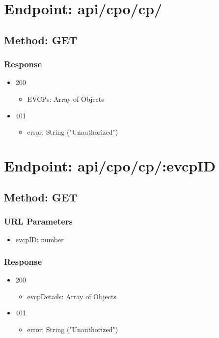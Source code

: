 \section*{Endpoint: api/cpo/cp/}
\subsection*{Method: GET}
\subsubsection*{Response}
\begin{itemize}
    \item 200
          \begin{itemize}
              \item EVCPs: Array of Objects
          \end{itemize}
    \item 401
          \begin{itemize}
              \item error: String ("Unauthorized")
          \end{itemize}
\end{itemize}

\section*{Endpoint: api/cpo/cp/:evcpID}
\subsection*{Method: GET}
\subsubsection*{URL Parameters}
\begin{itemize}
    \item evcpID: number
\end{itemize}
\subsubsection*{Response}
\begin{itemize}
    \item 200
          \begin{itemize}
              \item evcpDetails: Array of Objects
          \end{itemize}
    \item 401
          \begin{itemize}
              \item error: String ("Unauthorized")
          \end{itemize}
\end{itemize}

